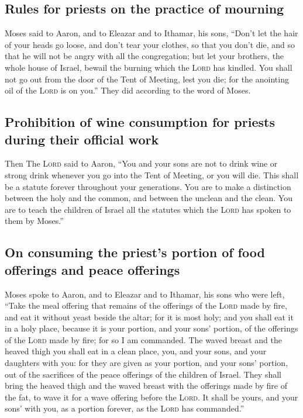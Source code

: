 \hypertarget{rules-for-priests-on-the-practice-of-mourning}{%
\subsection{Rules for priests on the practice of
mourning}\label{rules-for-priests-on-the-practice-of-mourning}}

 Moses said to Aaron, and to Eleazar and to Ithamar, his
sons, ``Don't let the hair of your heads go loose, and don't tear your
clothes, so that you don't die, and so that he will not be angry with
all the congregation; but let your brothers, the whole house of Israel,
bewail the burning which the \textsc{Lord} has kindled. 
You shall not go out from the door of the Tent of Meeting, lest you die;
for the anointing oil of the \textsc{Lord} is on you.'' They did
according to the word of Moses.

\hypertarget{prohibition-of-wine-consumption-for-priests-during-their-official-work}{%
\subsection{Prohibition of wine consumption for priests during their
official
work}\label{prohibition-of-wine-consumption-for-priests-during-their-official-work}}

 Then The \textsc{Lord} said to Aaron, 
``You and your sons are not to drink wine or strong drink whenever you
go into the Tent of Meeting, or you will die. This shall be a statute
forever throughout your generations.  You are to make a
distinction between the holy and the common, and between the unclean and
the clean.  You are to teach the children of Israel all
the statutes which the \textsc{Lord} has spoken to them by Moses.''

\hypertarget{on-consuming-the-priests-portion-of-food-offerings-and-peace-offerings}{%
\subsection{On consuming the priest's portion of food offerings and
peace
offerings}\label{on-consuming-the-priests-portion-of-food-offerings-and-peace-offerings}}

 Moses spoke to Aaron, and to Eleazar and to Ithamar, his
sons who were left, ``Take the meal offering that remains of the
offerings of the \textsc{Lord} made by fire, and eat it without yeast
beside the altar; for it is most holy;  and you shall eat
it in a holy place, because it is your portion, and your sons' portion,
of the offerings of the \textsc{Lord} made by fire; for so I am
commanded.  The waved breast and the heaved thigh you
shall eat in a clean place, you, and your sons, and your daughters with
you: for they are given as your portion, and your sons' portion, out of
the sacrifices of the peace offerings of the children of Israel.
 They shall bring the heaved thigh and the waved breast
with the offerings made by fire of the fat, to wave it for a wave
offering before the \textsc{Lord}. It shall be yours, and your sons'
with you, as a portion forever, as the \textsc{Lord} has commanded.''

